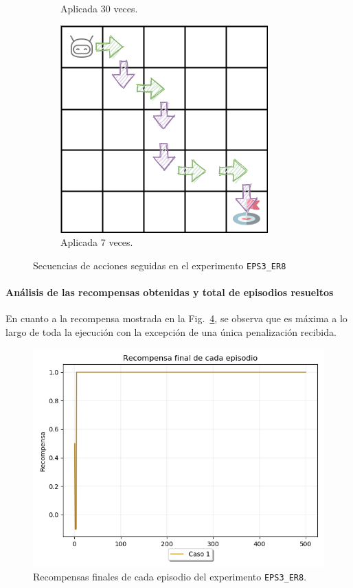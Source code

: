 \begin{figure}
\begin{subfigure}{.3\textwidth}
        \caption{Aplicada 30 veces.}
        \label{fig:dim5_lr0.01_ep0.7_30}
    \end{subfigure}%
    \begin{subfigure}{.3\textwidth}
        \centering
        \includegraphics[scale=0.35]{cap5_experimentacion/images/dim5_lr0.01_ep0.7_7.png}
        \caption{Aplicada 7 veces.}
        \label{fig:dim5_lr0.01_ep0.7_7}
    \end{subfigure}
    \caption{Secuencias de acciones seguidas en el experimento \texttt{EPS3\_ER8}}
    \label{fig:dim5_lr0.01_ep0.7}
\end{figure}


\paragraph{Análisis de las recompensas obtenidas y total de episodios resueltos} 

En cuanto a la recompensa mostrada en la Fig.~\ref{fig:dim5_lr0.01_ep0.7_recompensa}, se observa que es máxima a lo largo de toda la ejecución con la excepción de una única penalización recibida. \\

\begin{figure}
    \centering
    \includegraphics[scale=0.4]{cap5_experimentacion/images/dim5_lr0.01_ep0.7_recompensa.png}
    \caption{Recompensas finales de cada episodio del experimento \texttt{EPS3\_ER8}.}
    \label{fig:dim5_lr0.01_ep0.7_recompensa}
\end{figure}

